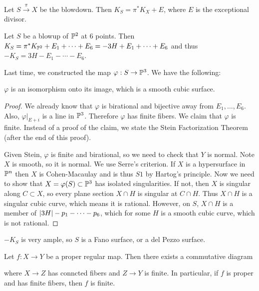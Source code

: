 \documentclass[twoside, 10pt]{article}
\begin{document}
        \begin{thm}
            Let $S \overset{\pi}{\to} X$ be the blowdown. Then $K_S = \pi^*K_X + E$, where $E$ is the exceptional divisor.
        \end{thm}

        \begin{cor}
            Let $S$ be a blowup of $\P^2$ at $6$ points. Then $K_S = \pi^* K_{\P^2} + E_1 + \cdots + E_6 = -3H + E_1 + \cdots + E_6$ and thus $-K_S = 3H - E_1 - \cdots - E_6$.
        \end{cor}

        Last time, we constructed the map $\varphi:S \to \P^3$. We have the following:

        \begin{thm}
            $\varphi$ is an isomorphism onto its image, which is a smooth cubic surface.
            \begin{proof}
                We already know that $\varphi$ is birational and bijective away from $E_1, \ldots, E_6$. Also, $\varphi|_{E+i}$ is a line in $\P^3$. Therefore $\varphi$ has finite fibers. We claim that $\varphi$ is finite. Instead of a proof of the claim, we state the Stein Factorization Theorem (after the end of this proof).

                Given Stein, $\varphi$ is finite and birational, so we need to check that $Y$ is normal. Note $X$ is smooth, so it is normal. We use Serre's criterion. If $X$ is a hypersurface in $\P^n$ then $X$ is Cohen-Macaulay and is thus $S1$ by Hartog's principle. Now we need to show that $X = \varphi(S) \subset \P^3$ has isolated singularities. If not, then $X$ is singular along $C \subset X$, so every plane section $X \cap H$ is singular at $C \cap H$. Thus $X \cap H$ is a singular cubic curve, which means it is rational. However, on $S$, $X \cap H$ is a member of $\abs{3H} - p_1 - \cdots - p_6$, which for some $H$ is a smooth cubic curve, which is not rational.
            \end{proof}
        \end{thm}

               
            

        \begin{cor}
            $-K_S$ is very ample, so $S$ is a Fano surface, or a del Pezzo surface.
        \end{cor}
        
        \begin{thm}
            Let $f: X \to Y$ be a proper regular map. Then there exists a commutative diagram
            \begin{center}
            \end{center}
            where $X \to Z$ has conncted fibers and $Z \to Y$ is finite. In particular, if $f$ is proper and has finite fibers, then $f$ is finite.
        \end{thm}
        
    
\end{document}
